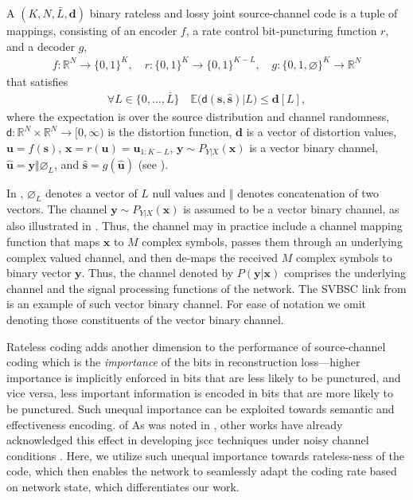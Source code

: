 \begin{definition} \label{def:def1}
A \((K,N, \bar{L}, \mathbf{d})\) binary rateless and lossy joint source-channel code is a tuple of mappings, consisting of an encoder \( f \), a rate control bit-puncturing function $r$, and a decoder \( g \), 
\begin{align}%
      f: \mathbb{R}^N\rightarrow \{0,1\}^K, \quad r: \{0,1\}^{K} \rightarrow \{0,1\}^{K-L}  , \quad   g: \{0,1, \varnothing \}^K \rightarrow \mathbb{R}^N 
\label{eq:prb-def}
\end{align}
that  satisfies
\begin{align} \label{Eq:vectorloss}
\forall L \in \{0, \ldots, \bar{L}\} \quad \mathbb{E} \Big( \mathsf{d}({\mathbf{s}}, \hat{\mathbf{s}} ) | L \Big) \leq \mathbf{d}[L],
\end{align}
where the expectation is over the source distribution and channel randomness, 
$\mathsf{d}:  \mathbb{R}^N \times  \mathbb{R}^N \rightarrow [0, \infty)$ is the  distortion function,
$\mathbf{d}$ is a vector of distortion values,
\( \mathbf{u} = f(\mathbf{s}) \), \( \mathbf{x} = r(\mathbf{u}) = \mathbf{u}_{1:K-L} \), \( \mathbf{y} \sim P_{Y|X}(\mathbf{x}) \) is a vector binary channel, 
$\hat{\mathbf{u}} =  \mathbf{y} \Vert \bm{\varnothing}_L$, 
and \( \hat{\mathbf{s}} = g(\hat{\mathbf{u}}) \) (see ).
\end{definition}

In , $\bm{\varnothing}_L$ denotes a vector of $L$ null values and $\Vert$ denotes concatenation of two vectors. The channel \( \mathbf{y} \sim P_{Y|X}(\mathbf{x}) \) is assumed to be a vector binary channel, as also illustrated in . Thus, the channel may in practice include a channel mapping function that maps $\mathbf{x}$ to $M$ complex symbols, passes them through an underlying complex valued channel, and then de-maps the received $M$ complex symbols to binary vector $\mathbf{y}$. Thus, the channel denoted by $P(\mathbf{y}|\mathbf{x})$ comprises the underlying channel and the signal processing functions of the network. 
The SVBSC link from  is an example of such vector binary channel. For ease of notation we omit denoting those constituents of the vector binary channel.




Rateless coding adds another dimension to the performance of source-channel coding which is the \emph{importance} of the bits in reconstruction loss---higher importance is implicitly enforced in bits that are less likely to be punctured, and vice versa, less important information is encoded in bits that are more likely to be punctured. Such unequal importance can be exploited towards semantic and effectiveness encoding. of  As was noted in , other works have already acknowledged this effect in developing \gls{jscc} techniques  under noisy channel conditions \cite{1095155,748707,tung2024multilevelreliabilityinterfacesemantic,bursalioglu2008lossy,bursalioglu2013joint}. Here, we utilize such unequal importance towards rateless-ness of the code, which then enables the network to seamlessly adapt the coding rate based on network state, which differentiates our work.


